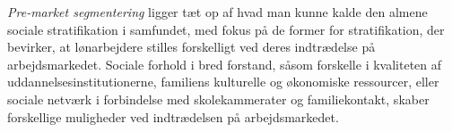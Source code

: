
















\emph{Pre-market segmentering } ligger tæt op af hvad man kunne kalde den almene sociale stratifikation i samfundet, med fokus på de former for stratifikation, der bevirker, at lønarbejdere stilles forskelligt ved deres indtrædelse på arbejdsmarkedet. Sociale forhold i bred forstand, såsom forskelle i kvaliteten af uddannelsesinstitutionerne, familiens kulturelle og økonomiske ressourcer, eller sociale netværk i forbindelse med skolekammerater og familiekontakt, skaber forskellige muligheder ved indtrædelsen på arbejdsmarkedet. 

